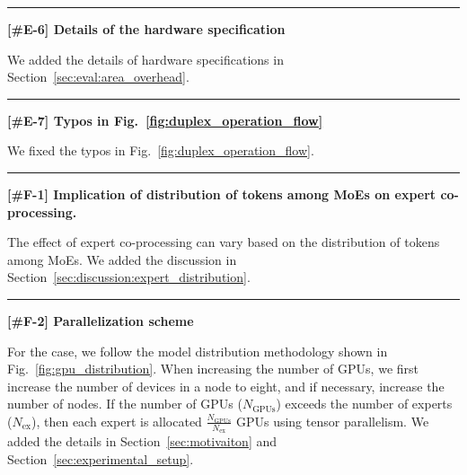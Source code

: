 \noindent
\rule[0.5ex]{8.8cm}{0.5pt}

\noindent
\textbf{[\#E-6] Details of the hardware specification}
%

We added the details of hardware specifications in Section~\ref{sec:eval:area_overhead}.

\noindent
\rule[0.5ex]{8.8cm}{0.5pt}

\noindent
\textbf{[\#E-7] Typos in Fig.~\ref{fig:duplex_operation_flow}}
%

We fixed the typos in Fig.~\ref{fig:duplex_operation_flow}.


\noindent
\rule[0.5ex]{8.8cm}{0.5pt}

\noindent
\textbf{[\#F-1] Implication of distribution of tokens among MoEs on expert co-processing.}


The effect of expert co-processing can vary based on the distribution of tokens among MoEs.
We added the discussion in Section~\ref{sec:discussion:expert_distribution}.
%


\noindent
\rule[0.5ex]{8.8cm}{0.5pt}

\noindent
\textbf{[\#F-2] Parallelization scheme}
%

For the \doublegpu case, we follow the model distribution methodology shown in Fig.~\ref{fig:gpu_distribution}. 
When increasing the number of GPUs, we first increase the number of devices in a node to eight, and if necessary, increase the number of nodes. 
If the number of GPUs ($N_{\text{GPUs}}$) exceeds the number of experts ($N_{\text{ex}}$), then each expert is allocated \(\frac{N_{\text{GPUs}}}{N_{\text{ex}}}\) GPUs using tensor parallelism.
We added the details in Section~\ref{sec:motivaiton} and Section~\ref{sec:experimental_setup}.